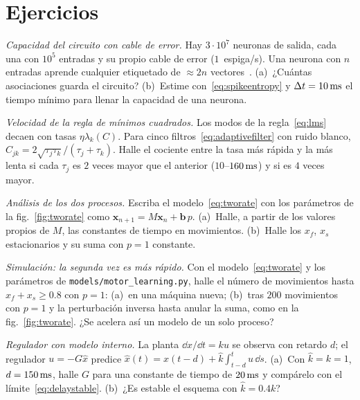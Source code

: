 \section{Ejercicios}

\begin{exercise}[\lvlA]
\label{ex:15:1}
\emph{Capacidad del circuito con cable de error.} Hay $3\cdot10^7$ neuronas de salida, cada una con $10^5$ entradas y su propio cable de error ($1$~espiga/s). Una neurona con $n$ entradas aprende cualquier etiquetado de $\approx2n$ vectores~\cite{Cover1965}. (a)~¿Cuántas asociaciones guarda el circuito? (b)~Estime con~\eqref{eq:spikeentropy} y $\Delta t=10\,\text{ms}$ el tiempo mínimo para llenar la capacidad de una neurona.
\end{exercise}

\begin{exercise}[\lvlB]
\label{ex:15:2}
\emph{Velocidad de la regla de mínimos cuadrados.} Los modos de la regla~\eqref{eq:lms} decaen con tasas $\eta\lambda_k(C)$. Para cinco filtros~\eqref{eq:adaptivefilter} con ruido blanco, $C_{jk}=2\sqrt{\tau_j\tau_k}/(\tau_j+\tau_k)$. Halle el cociente entre la tasa más rápida y la más lenta si cada $\tau_j$ es $2$ veces mayor que el anterior ($10$--$160\,\text{ms}$) y si es $4$ veces mayor.
\end{exercise}

\begin{exercise}[\lvlB]
\label{ex:15:3}
\emph{Análisis de los dos procesos.} Escriba el modelo~\eqref{eq:tworate} con los parámetros de la fig.~\ref{fig:tworate} como $\mathbf x_{n+1}=M\mathbf x_n+\mathbf b\,p$. (a)~Halle, a partir de los valores propios de $M$, las constantes de tiempo en movimientos. (b)~Halle los $x_f$, $x_s$ estacionarios y su suma con $p=1$ constante.
\end{exercise}

\begin{exercise}[\lvlB]
\label{ex:15:4}
\emph{Simulación: la segunda vez es más rápido.} Con el modelo~\eqref{eq:tworate} y los parámetros de \texttt{models/\allowbreak motor\_learning.py}, halle el número de movimientos hasta $x_f+x_s\ge0.8$ con $p=1$: (a)~en una máquina nueva; (b)~tras $200$ movimientos con $p=1$ y la perturbación inversa hasta anular la suma, como en la fig.~\ref{fig:tworate}. ¿Se acelera así un modelo de un solo proceso?
\end{exercise}

\begin{exercise}[\lvlB]
\label{ex:15:5}
\emph{Regulador con modelo interno.} La planta $\dd x/\dd t=ku$ se observa con retardo $d$; el regulador $u=-G\hat x$ predice $\hat x(t)=x(t-d)+\hat k\int_{t-d}^{t}u\,\dd s$. (a)~Con $\hat k=k=1$, $d=150\,\text{ms}$, halle $G$ para una constante de tiempo de $20\,\text{ms}$ y compárelo con el límite~\eqref{eq:delaystable}. (b)~¿Es estable el esquema con $\hat k=0.4k$?
\end{exercise}

